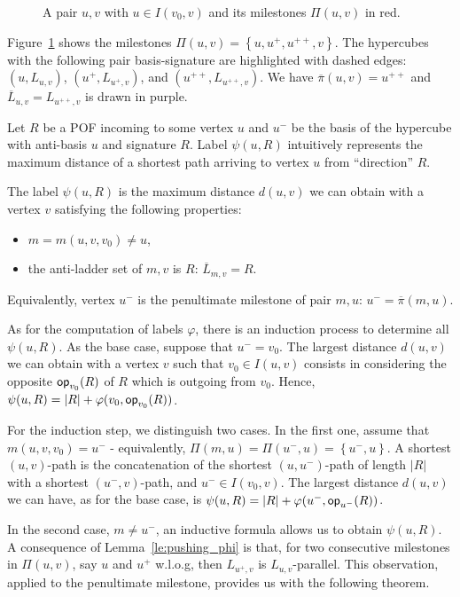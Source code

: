 \documentclass[a4paper,UKenglish,numberwithinsect,cleveref, autoref]{lipics-v2021}
\newcommand{\set}[1]{\left\{ #1 \right\}}
\newcommand{\card}[1]{\left| #1 \right|}
\newcommand{\opp}{\mbox{\textsf{op}}}
\begin{document}
\begin{figure}[h]
\centering
\scalebox{0.9}{}
\caption{A pair $u,v$ with $u \in I(v_0,v)$ and its milestones $\Pi(u,v)$ in red.}
\label{fig:milestones}
\end{figure}

Figure~\ref{fig:milestones} shows the milestones $\Pi(u,v) = \set{u,u^+,u^{++},v}$. The hypercubes with the following pair basis-signature are highlighted with dashed edges: $(u,L_{u,v})$, $(u^+,L_{u^+,v})$, and $(u^{++},L_{u^{++},v})$. We have $\overline{\pi}(u,v) = u^{++}$ and $\overline{L}_{u,v} = L_{u^{++},v}$ is drawn in purple.

Let $R$ be a POF incoming to some vertex $u$ and $u^-$ be the basis of the hypercube with anti-basis $u$ and signature $R$.  Label $\psi(u,R)$ intuitively represents the maximum distance of a shortest path arriving to vertex $u$ from ``direction'' $R$. 

\begin{definition}
The label $\psi(u,R)$ is the maximum distance $d(u,v)$ we can obtain with a vertex $v$ satisfying the following properties:
\begin{itemize}
\item $m = m(u,v,v_0) \neq u$,
\item the anti-ladder set of $m,v$ is $R$: $\overline{L}_{m,v} = R$.
\end{itemize}
Equivalently, vertex $u^-$ is the penultimate milestone of pair $m,u$: $u^- = \overline{\pi}(m,u)$.
\label{def:psi}
\end{definition}

As for the computation of labels $\varphi$, there is an induction process to determine all $\psi(u,R)$. As the base case, suppose that $u^- = v_0$. The largest distance $d(u,v)$ we can obtain with a vertex $v$ such that $v_0 \in I(u,v)$ consists in considering the opposite $\opp_{v_0}(R)$ of $R$ which is outgoing from $v_0$. Hence, $\psi(u,R) = \card{R} + \varphi(v_0,\opp_{v_0}(R))$.

For the induction step, we distinguish two cases. In the first one, assume that $m(u,v,v_0) = u^-$ - equivalently, $\Pi(m,u) = \Pi(u^-,u) = \set{u^-,u}$. A shortest $(u,v)$-path is the concatenation of the shortest $(u,u^-)$-path of length $\card{R}$ with a shortest $(u^-,v)$-path, and $u^- \in I(v_0,v)$. The largest distance $d(u,v)$ we can have, as for the base case, is $\psi(u,R) = \card{R} + \varphi(u^-,\opp_{u^-}(R))$.

In the second case, $m \neq u^-$, an inductive formula allows us to obtain $\psi(u,R)$. A consequence of Lemma~\ref{le:pushing_phi} is that, for two consecutive milestones in $\Pi(u,v)$, say $u$ and $u^+$ w.l.o.g, then $L_{u^+,v}$ is $L_{u,v}$-parallel. This observation, applied to the penultimate milestone, provides us with the following theorem.
\end{document}
